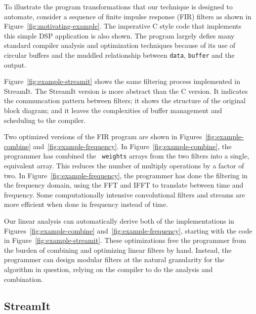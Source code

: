 To illustrate the program transformations that our technique is
designed to automate, consider a sequence of finite impulse response
(FIR) filters as shown in Figure~\ref{fig:motivating-example}. The
imperative C style code that implements this simple DSP application is
also shown. The program largely defies many standard compiler analysis
and optimization techniques because of its use of circular buffers and
the muddled relationship between {\tt data}, {\tt buffer} and the
output.

Figure~\ref{fig:example-streamit} shows the same filtering process
implemented in StreamIt. The StreamIt version is more abstract than
the C version.  It indicates the communcation pattern between filters;
it shows the structure of the original block diagram; and it leaves
the complexities of buffer management and scheduling to the compiler.

Two optimized versions of the FIR program are shown in
Figures~\ref{fig:example-combine} and~\ref{fig:example-frequency}.  In
Figure~\ref{fig:example-combine}, the programmer has combined the {\tt
weights} arrays from the two filters into a single, equivalent array.
This reduces the number of multiply operations by a factor of two.  In
Figure~\ref{fig:example-frequency}, the programmer has done the
filtering in the frequency domain, using the FFT and IFFT to translate
between time and frequency.  Some computationally intensive
convolutional filters and streams are more efficient when done in
frequency instead of time.

Our linear analysis can automatically derive both of the
implementations in Figures~\ref{fig:example-combine}
and~\ref{fig:example-frequency}, starting with the code in
Figure~\ref{fig:example-streamit}.  These optimizations free the
programmer from the burden of combining and optimizing linear filters
by hand.  Instead, the programmer can design modular filters at the
natural granularity for the algorithm in question, relying on the
compiler to do the analysis and combination.

\subsection{StreamIt}


